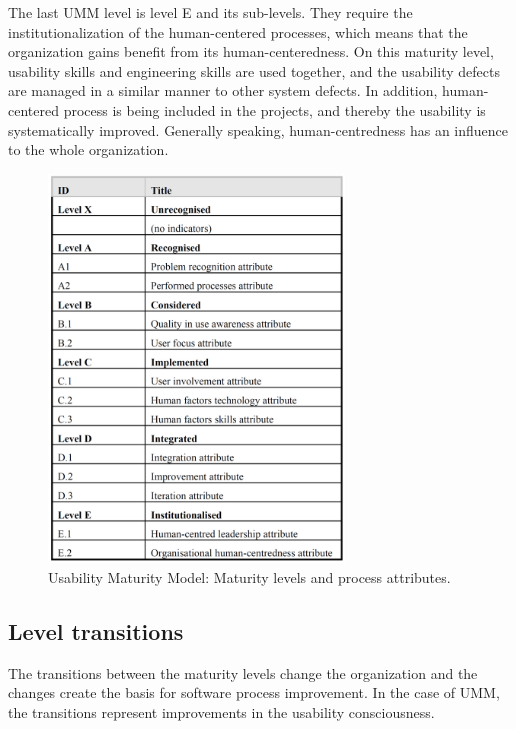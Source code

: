 \documentclass[12pt,a4paper,oneside,pdftex]{report}
\begin{document}
The last UMM level is level E and its sub-levels. They require the institutionalization of the human-centered processes, which means that the organization gains benefit from its human-centeredness. On this maturity level, usability skills and engineering skills are used together, and the usability defects are managed in a similar manner to other system defects. In addition, human-centered process is being included in the projects, and thereby the usability is systematically improved. Generally speaking, human-centredness has an influence to the whole organization. \citep{RefWorks:30}

\begin{figure}[H]
  	\centering
  	\includegraphics[width=0.7\textwidth]{./images/umm_levels.png}\hspace*{4cm}
  	\caption{Usability Maturity Model: Maturity levels and process attributes. \citep{RefWorks:30}}
	\label{fig:umm}
\end{figure}

\subsection{Level transitions}

The transitions between the maturity levels change the organization and the changes create the basis for software process improvement. In the case of UMM, the transitions represent improvements in the usability consciousness. 
\end{document}
